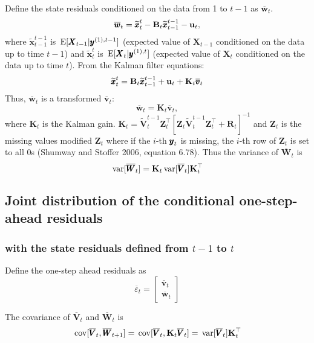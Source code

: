 \documentclass[]{article}
\def\UPS{\mbox{\boldmath $\Upsilon$}}
\def\XI{\mbox{\boldmath $\Xi$}}
\def\BB{\mbox{$\mathbf B$}}	\def\bb{\mbox{$\mathbf b$}} \def\Bb{\mbox{$\mathbf J$}} \def\Ba{\mbox{$\mathbf L$}} \def\Bm{\UPS}
\def\E{\,\textup{\textrm{E}}}
\def\KK{\mbox{$\mathbf K$}}
\def\RR{\mbox{$\mathbf R$}}	 \def\rr{\mbox{$\mathbf r$}} \def\Rb{\mbox{$\mathbf H$}}	\def\Rm{\mathbb{R}}
\def\VV{\mbox{$\pmb{V}$}}	\def\vv{\mbox{$\pmb{v}$}}
\def\WW{\mbox{$\pmb{W}$}}	\def\ww{\mbox{$\pmb{w}$}}
\def\XX{\mbox{$\pmb{X}$}}	\def\xx{\mbox{$\pmb{x}$}}
\def\ZZ{\mbox{$\mathbf Z$}}	\def\zz{\mbox{$\mathbf z$}}	\def\Zb{\mbox{$\mathbf M$}} \def\Za{\mbox{$\mathbf N$}} \def\Zm{\XI}
\def\var{\,\textup{\textrm{var}}}
\def\cov{\,\textup{\textrm{cov}}}
\def\hatxtt{\widetilde{\xx}_t^{t}}
\def\hatxtmt1{\widetilde{\xx}_{t-1}^{t-1}}
\def\checkWt{\overline{\WW}_{t}}
\def\checkWtp{\overline{\WW}_{t+1}}
\def\checkwt{\overline{\ww}_t}
\def\checkvt{\overline{\vv}_t}
\def\checkVt{\overline{\VV}_t}
\def\hatVttm{\widetilde{\VV}_t^{t-1}}
\begin{document}
Define the state residuals conditioned on the data from 1 to $t-1$ as $\checkwt$.
\begin{equation}\label{eq:wtt1}
\checkwt = \hatxtt - \BB_t\hatxtmt1 - \uu_t,
\end{equation}
where $\hatxtmt1$ is $\E[\XX_{t-1}|\yy^{(1),t-1}]$ (expected value of $\XX_{t-1}$ conditioned on the data up to time $t-1$) and $\hatxtt$ is $\E[\XX_{t}|\yy^{(1),t}]$ (expected value of $\XX_{t}$ conditioned on the data up to time $t$). 
From the Kalman filter equations:
\begin{equation}\label{eq:wtt1.2}
\hatxtt = \BB_t\hatxtmt1 + \uu_t + \KK_t \checkvt
\end{equation}
Thus, $\checkwt$ is a transformed $\checkvt$:
\begin{equation}\label{eq:wtt1.3}
\checkwt = \KK_t \checkvt,
\end{equation}
where $\KK_t$ is the Kalman gain. $\KK_t = \hatVttm \ZZ_t^\top[\ZZ_t \hatVttm \ZZ_t^\top + \RR_t]^{-1}$ and $\ZZ_t$ is the missing values modified $\ZZ_t$ where if the $i$-th $\mbox{$\pmb{y}$}_t$ is missing, the $i$-th row of $\ZZ_t$ is set to all 0s (Shumway and Stoffer 2006, equation 6.78).
Thus the variance of $\checkWt$ is 
\begin{equation}\label{eq:var.Wt}
\var[\checkWt] = \KK_t \var[\checkVt] \KK_t^\top
\end{equation}

\subsection{Joint distribution of the conditional one-step-ahead residuals}

\subsubsection{with the state residuals defined from $t-1$ to $t$}

Define the one-step ahead residuals as
\begin{equation}
\overline{\varepsilon}_t = \begin{bmatrix}\checkvt\\ \checkwt \end{bmatrix}
\end{equation}

The covariance of $\checkVt$ and $\checkWt$ is
\begin{equation}\label{eq:covhatVtWtp.onestep}
\cov[\checkVt,\checkWtp] = \cov[\checkVt,\KK_{t}\checkVt] = \var[\checkVt]\KK_{t}^\top
\end{equation}
\end{document}
